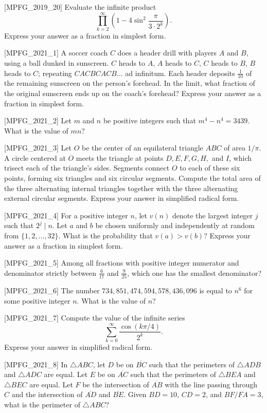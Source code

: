 [MPFG_2019_20]
Evaluate the infinite product
$$\prod_{k=2}^\infty \left(1 - 4\sin^2\frac{\pi}{3\cdot 2^k}\right).$$
Express your answer as a fraction in simplest form.

[MPFG_2021_1]
A soccer coach $C$ does a header drill with players $A$ and $B$, using a ball dunked in sunscreen. $C$ heads to $A$, $A$ heads to $C$, $C$ heads to $B$, $B$ heads to $C$; repeating $CACBCACB\dots$ ad infinitum. Each header deposits $\frac{1}{10}$ of the remaining sunscreen on the person's forehead. In the limit, what fraction of the original sunscreen ends up on the coach's forehead? Express your answer as a fraction in simplest form.

[MPFG_2021_2]
Let $m$ and $n$ be positive integers such that $m^4 - n^4 = 3439$. What is the value of $mn$?

[MPFG_2021_3]
Let $O$ be the center of an equilateral triangle $ABC$ of area $1/\pi$. A circle centered at $O$ meets the triangle at points $D, E, F, G, H,$ and $I$, which trisect each of the triangle's sides. Segments connect $O$ to each of these six points, forming six triangles and six circular segments. Compute the total area of the three alternating internal triangles together with the three alternating external circular segments. Express your answer in simplified radical form.

[MPFG_2021_4]
For a positive integer $n$, let $v(n)$ denote the largest integer $j$ such that $2^j \mid n$. Let $a$ and $b$ be chosen uniformly and independently at random from $\{1, 2, \dots, 32\}$. What is the probability that $v(a) > v(b)$? Express your answer as a fraction in simplest form.

[MPFG_2021_5]
Among all fractions with positive integer numerator and denominator strictly between $\frac{6}{17}$ and $\frac{9}{25}$, which one has the smallest denominator?

[MPFG_2021_6]
The number $734,851,474,594,578,436,096$ is equal to $n^6$ for some positive integer $n$. What is the value of $n$?

[MPFG_2021_7]
Compute the value of the infinite series
$$\sum_{k=0}^\infty \frac{\cos(k\pi/4)}{2^k}.$$
Express your answer in simplified radical form.

[MPFG_2021_8]
In $\triangle ABC$, let $D$ be on $\overline{BC}$ such that the perimeters of $\triangle ADB$ and $\triangle ADC$ are equal. Let $E$ be on $\overline{AC}$ such that the perimeters of $\triangle BEA$ and $\triangle BEC$ are equal. Let $F$ be the intersection of $\overline{AB}$ with the line passing through $C$ and the intersection of $\overline{AD}$ and $\overline{BE}$. Given $BD=10$, $CD=2$, and $BF/FA=3$, what is the perimeter of $\triangle ABC$?

